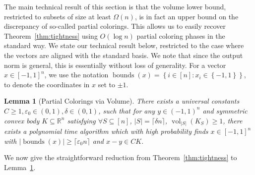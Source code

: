 \documentclass[11pt]{article}
\newtheorem{theorem}{Theorem}
\newtheorem{lemma}[theorem]{Lemma}
\newcommand{\ceil}[1]{\lceil #1 \rceil}
\newcommand{\R}{{\mathbb{R}}}
\newcommand\eps{\varepsilon}
\newcommand{\set}[1]{\left\{ #1 \right\}}
\DeclareMathOperator{\vollb}{volLB}
\DeclareMathOperator{\hd}{hd}
\DeclareMathOperator{\vol}{vol}
\DeclareMathOperator{\bnds}{bounds}
\newcommand{\notename}[2]{{\textcolor{red}{{\bf (#1:} {#2}{\bf ) }}}}
\newcommand{\notename}[2]{{\textcolor{red}{\footnotesize{\bf (#1:} {#2}{\bf ) }}}}
\newcommand{\dnote}[1]{{\notename{Daniel}{#1}}}
\newcommand{\notename}[2]{{}}
\newcommand{\dnote}[1]{}
\begin{document}
\tightvollb*

The main technical result of this section is that the volume lower bound,
restricted to subsets of size at least $\Omega(n)$, is in fact an upper bound on
the discrepancy of so-called partial colorings. This allows us to easily recover
Theorem~\ref{thm:tightness} using $O(\log n)$ partial coloring phases in the
standard way. We state our technical result below, restricted to the case where
the vectors are aligned with the standard basis. We note that since the output
norm is general, this is essentially without loss of generality. For a vector $x
\in [-1,1]^n$, we use the notation $\bnds(x) = \set{i \in [n]: x_i \in
\set{-1,1}}$, to denote the coordinates in $x$ set to $\pm 1$. 

\begin{lemma}[Partial Colorings via Volume] \label{lem:partial-via-volume}
There exists a universal constants $C \geq 1, \eps_0 \in (0,1), \delta \in (0,1)$, such that
for any $y \in (-1,1)^n$ and symmetric convex body $K \subseteq \R^n$ satisfying
$\forall S \subseteq [n]$, $|S| = \ceil{\delta n}$, $\vol_{|S|}(K_S) \geq 1$, there
exists a polynomial time algorithm which with high probability finds $x \in
[-1,1]^n$ with $|\bnds(x)| \geq \ceil{\eps_0 n}$ and
$x-y \in C K$.  
\end{lemma}

We now give the straightforward reduction from Theorem~\ref{thm:tightness} to
Lemma~\ref{lem:partial-via-volume}.
\end{document}
